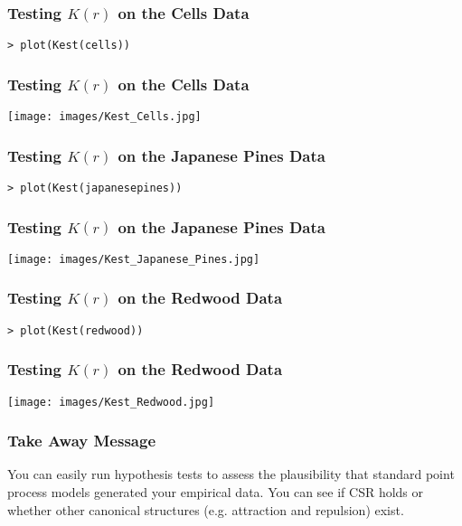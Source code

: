 \documentclass{beamer}
\begin{document}
\begin{frame}[fragile]
	\frametitle{Testing $K(r)$ on the Cells Data}

	\begin{verbatim}
> plot(Kest(cells))
	\end{verbatim}
\end{frame}

\begin{frame}[fragile]
	\frametitle{Testing $K(r)$ on the Cells Data}

	\begin{center}
		\texttt{[image: images/Kest\_Cells.jpg]}
	\end{center}
\end{frame}

\begin{frame}[fragile]
	\frametitle{Testing $K(r)$ on the Japanese Pines Data}

	\begin{verbatim}
> plot(Kest(japanesepines))
	\end{verbatim}
\end{frame}

\begin{frame}[fragile]
	\frametitle{Testing $K(r)$ on the Japanese Pines Data}

	\begin{center}
		\texttt{[image: images/Kest\_Japanese\_Pines.jpg]}
	\end{center}
\end{frame}

\begin{frame}[fragile]
	\frametitle{Testing $K(r)$ on the Redwood Data}

	\begin{verbatim}
> plot(Kest(redwood))
	\end{verbatim}
\end{frame}

\begin{frame}[fragile]
	\frametitle{Testing $K(r)$ on the Redwood Data}

	\begin{center}
		\texttt{[image: images/Kest\_Redwood.jpg]}
	\end{center}
\end{frame}

\begin{frame}[fragile]
	\frametitle{Take Away Message}
	
	You can easily run hypothesis tests to assess the plausibility that standard point process models generated your empirical data. You can see if CSR holds or whether other canonical structures (e.g. attraction and repulsion) exist.
\end{frame}
\end{document}
